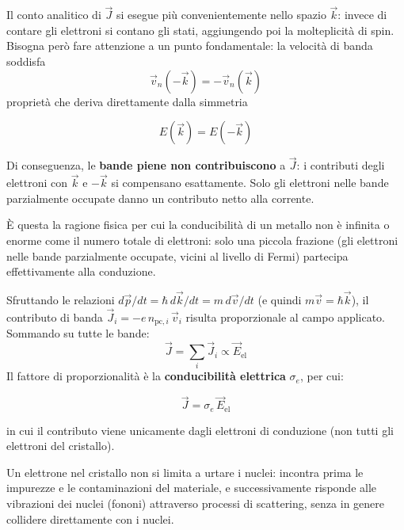 Il conto analitico di \(\vec{J}\) si esegue più convenientemente nello spazio \(\vec{k}\): invece di contare gli elettroni si contano gli stati, aggiungendo poi la molteplicità di spin. Bisogna però fare attenzione a un punto fondamentale: la velocità di banda soddisfa
\begin{equation}
    \vec{v}_n(-\vec{k}) = -\vec{v}_n(\vec{k})
\end{equation}
proprietà che deriva direttamente dalla simmetria
\begin{importantbox}
    \begin{equation}
        E(\vec{k}) = E(-\vec{k})
    \end{equation}
\end{importantbox}
Di conseguenza, le \textbf{bande piene non contribuiscono} a \(\vec{J}\): i contributi degli elettroni con \(\vec{k}\) e \(-\vec{k}\) si compensano esattamente. Solo gli elettroni nelle bande parzialmente occupate danno un contributo netto alla corrente.

\begin{remark}
È questa la ragione fisica per cui la conducibilità di un metallo non è infinita o enorme come il numero totale di elettroni: solo una piccola frazione (gli elettroni nelle bande parzialmente occupate, vicini al livello di Fermi) partecipa effettivamente alla conduzione.
\end{remark}

Sfruttando le relazioni \(d\vec{p}/dt = \hbar\, d\vec{k}/dt = m\, d\vec{v}/dt\) (e quindi \(m \vec{v} = \hbar \vec{k}\)), il contributo di banda \(\vec{J}_i = -e\, n_{\text{pc}, i}\, \vec{v}_i\) risulta proporzionale al campo applicato. Sommando su tutte le bande:
\begin{equation}
    \vec{J} = \sum_i \vec{J}_i \propto \vec{E}_{\text{el}}
\end{equation}
Il fattore di proporzionalità è la \textbf{conducibilità elettrica} \(\sigma_e\), per cui:
\begin{importantbox}
    \begin{equation}
        \vec{J} = \sigma_e\, \vec{E}_{\text{el}}
    \end{equation}
\end{importantbox}
in cui il contributo viene unicamente dagli elettroni di conduzione (non tutti gli elettroni del cristallo).

\begin{remark}
Un elettrone nel cristallo non si limita a urtare i nuclei: incontra prima le impurezze e le contaminazioni del materiale, e successivamente risponde alle vibrazioni dei nuclei (fononi) attraverso processi di scattering, senza in genere collidere direttamente con i nuclei.
\end{remark}



